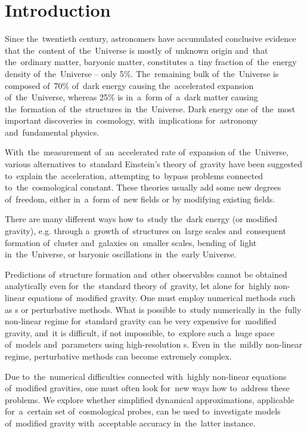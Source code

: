 \clearpage{}\chapter*{Introduction}
Since the~twentieth century, astronomers have accumulated conclusive evidence that the~content of~the~Universe is mostly of~unknown origin and~that the~ordinary matter, baryonic matter, constitutes a~tiny fraction of~the~energy density of~the~Universe -- only 5\%. The~remaining bulk of~the~Universe is composed of~70\% of~dark energy causing the~accelerated expansion of~the~Universe, whereas 25\% is in~a~form of~a~dark matter causing the~formation of~the~structures in~the~Universe. Dark energy \DIFdelbegin {}\DIFdelend \DIFaddbegin {}\DIFaddend one of~the~most important discoveries in~cosmology, with~\DIFdelbegin {}\DIFdelend \DIFaddbegin {}\DIFaddend implications for~astronomy and~fundamental physics.

With~the~measurement of~an~accelerated rate of~expansion of~the~Universe, various alternatives to~standard Einstein's theory of~gravity have been suggested to~explain the~acceleration, attempting to~bypass problems connected to~the~cosmological constant. These theories usually add some new degrees of~freedom, either in~a~form of~new fields or by modifying existing fields.

There are many different ways how to~study the~dark energy (or modified gravity), e.g. through a~growth of~structures on~large scales and~consequent formation of~cluster and~galaxies on~smaller scales, bending of~light in~the~Universe, or baryonic oscillations in~the~early Universe.

Predictions of~structure formation and~other observables cannot be obtained analytically even for~the~standard theory of~gravity, let alone for~highly non-linear equations of~modified gravity. One must employ numerical methods such as \nbodysim s or perturbative methods. What is possible to~study numerically in~the~fully non-linear regime for~standard gravity can be very expensive for~modified gravity, and~it is difficult, if not impossible, to~explore such a~huge space of~models and~parameters using high-resolution \nbodysim s. Even in~the~mildly non-linear regime, perturbative methods can become extremely complex.

Due to~the~numerical difficulties connected with~highly non-linear equations of~modified gravities, one must often look for~new ways how to~address these problems. We explore whether simplified dynamical approximations, applicable for~a~certain set of~cosmological probes, can be used to~investigate models of~modified gravity with~acceptable accuracy in~the~latter instance.

